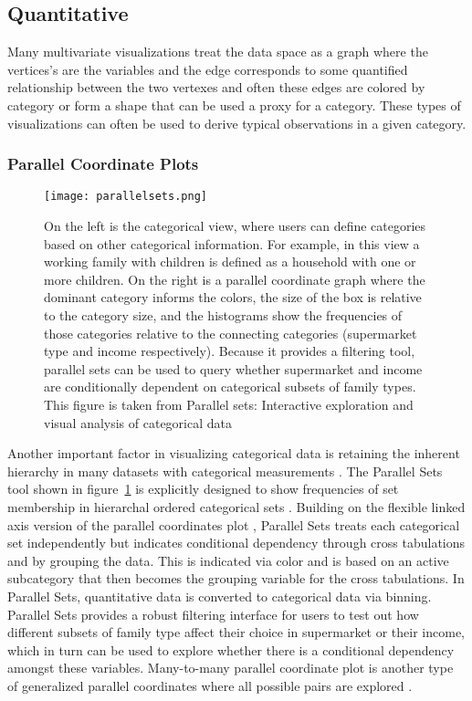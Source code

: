 \documentclass[../main.text]{subfiles}
\begin{document}
\subsection{Quantitative}

Many multivariate visualizations treat the data space as a graph where the vertices's are the variables and the edge corresponds to some quantified relationship between the two vertexes and often these edges are colored by category or form a shape that can be used a proxy for a category. These types of visualizations can often be used to derive typical observations in a given category.

\subsubsection{Parallel Coordinate Plots}
\begin{figure}
  \texttt{[image: parallelsets.png]}
  \caption{On the left is the categorical view, where users can define
    categories based on other categorical information. For example, in this
    view a working family with children is defined as a household with one or
    more children. On the right is a parallel coordinate graph where the
    dominant category informs the colors, the size of the box is relative to
    the category size, and the histograms show the frequencies of those
    categories relative to the connecting categories (supermarket type and income
    respectively). Because it provides a filtering tool, parallel sets can be used to query whether supermarket and income are conditionally dependent on categorical subsets of family types. This figure is taken from Parallel sets: Interactive exploration and visual analysis of categorical data \cite{kosara_parallel_2006}}
  \label{fig:parallelsets}
\end{figure}

Another important factor in visualizing categorical data is retaining the
inherent hierarchy in many datasets with categorical measurements
\cite{shneiderman_visualizing_2000}. The Parallel Sets tool
shown in figure~\ref{fig:parallelsets} is explicitly designed to show frequencies
of set membership in hierarchal ordered categorical sets \cite{kosara_parallel_2006}. Building on the flexible linked axis version of the parallel coordinates plot \cite{claessen_flexible_2011}, Parallel Sets
  treats each categorical set independently but indicates conditional
  dependency through cross tabulations and by grouping the data. This is indicated via
  color and is based on an active subcategory that then becomes the grouping variable for the
  cross tabulations. In Parallel Sets, quantitative data is converted to
  categorical data via binning. Parallel Sets provides a robust filtering interface for users to test out how different subsets of family type affect their choice in supermarket or their income, which in turn can be used to explore whether there is a conditional dependency amongst these variables. Many-to-many parallel coordinate plot is another type of generalized parallel coordinates where all possible pairs are explored \cite{lind_many--many_2009}.  
\end{document}
